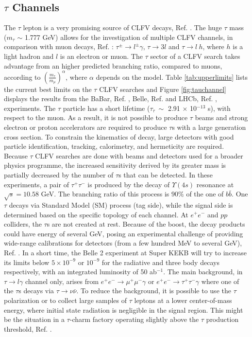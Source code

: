 \subsection{$\tau$ Channels}
The $\tau$ lepton is a very promising source of CLFV decays, Ref. \cite{universe8060299}. 
The huge $\tau$ mass ($m_\tau$ $\sim$ 1.777 GeV) allows for the investigation of multiple CLFV channels, in comparison with muon decays, Ref. \cite{clfv_signorelli}: 
$\tau^\pm \rightarrow l^\pm \gamma$, $\tau \rightarrow 3l$ and $\tau\rightarrow l \ h$, 
where $h$ is a light hadron and $l$ is an electron or muon. The $\tau$ sector of a CLFV search takes advantage from an higher predicted branching ratio, compared to muons, 
according to $(\frac{m_\tau}{m_\mu})^\alpha$, where $\alpha$ depends on the model. Table \ref{tab:upperlimits} lists the current best limits on the $\tau$ 
CLFV searches and Figure \ref{fig:tauchannel} displays the results from the BaBar, Ref. \cite{PhysRevD.77.091104}, Belle, Ref. \cite{ABASHIAN2002117} and LHCb, 
Ref. \cite{TheLHCbCollaboration2008}, experiments. The $\tau$ particle has a short lifetime ($\tau_\tau \ \sim$ 2.91 $\times$ 10$^{-13}$ s), with respect to the muon.
As a result, it is not possible to produce $\tau$ beams and strong electron or proton accelerators are required to produce $\tau$s with a large generation cross section. 
To constrain the kinematics of decay, large detectors with good particle identification, tracking, calorimetry, and hermeticity are required. 
Because $\tau$ CLFV searches are done with beams and detectors used for a broader physics programme, 
the increased sensitivity derived by its greater mass is partially decreased by the number of $\tau$s that can be detected.
In these experiments, a pair of $\tau^+ \tau^-$ is produced by the decay of $\Upsilon(4s)$ resonance at $\sqrt{s}=10.58$ GeV. The branching ratio of this process is  $90\%$ of 
the one of $b \bar{b}$. One $\tau$ decays via Standard Model (SM) process (tag side), while the signal side is determined based on the specific topology of each channel. 
At $e^+ e^-$ and $pp$ colliders, the $\tau$s are not created at rest. Because of the boost, the decay products could have 
energy of several GeV, posing an experimental challenge of providing wide-range calibrations for detectors (from a few hundred MeV to several GeV), Ref. \cite{universe8060299}.
In a short time, the Belle 2 experiment at Super KEKB will try to increase its limits below $5 \times 10^{-9}$ or $10^{-9}$ for the radiative and three body decays respectively, 
with an integrated luminosity of 50 ab$^{-1}$. The main background, in $\tau \rightarrow l \gamma$ channel only, arises from
$e^+ e^- \rightarrow \mu^+ \mu^- \gamma$ or $e^+ e^- \rightarrow \tau^+ \tau^- \gamma$ where one of the $\tau$s decays via $\tau \rightarrow \nu \bar{\nu}$.
To reduce the background, it is possible to use the $\tau$ polarization or to collect large samples of
$\tau$ leptons at a lower center-of-mass energy, where initial state radiation is negligible in the signal region. This might be the situation in a $\tau$-charm 
factory operating slightly above the $\tau$ production threshold, Ref. \cite{Bennett_2016}.

